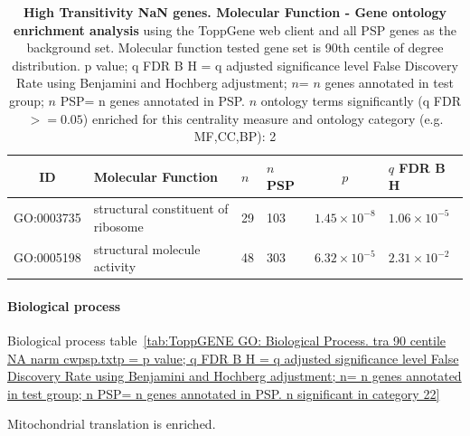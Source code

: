   \begin{table}[ht]
\centering
\begin{adjustbox}{width=\textwidth}
\setlength{\extrarowheight}{2pt}
\begin{tabular}{@{}clllcl@{}}
  \toprule
  ID &Molecular Function & $n$ & $n$ PSP & $p$ & $q$ FDR B H \\ 

  \midrule
GO:0003735 & structural constituent of ribosome & 29 & 103 & $1.45 \times 10^{-8}$ & $1.06 \times 10^{-5}$ \\ 
  GO:0005198 & structural molecule activity & 48 & 303 & $6.32 \times 10^{-5}$ & $2.31 \times 10^{-2}$ \\ 
   \hline
\end{tabular}
\end{adjustbox}
\caption[Gene ontology enrichment High Transitivity NaN genes. Molecular Function of genes above 90th centile of distribution]{\textbf{High Transitivity NaN genes. Molecular Function - Gene ontology enrichment analysis} using the ToppGene web client and all PSP genes as the background set.  Molecular function tested gene set is 90th centile of degree distribution.  p value; q FDR B H = q adjusted significance level False Discovery Rate using Benjamini and Hochberg adjustment; $n$= $n$ genes annotated in test group; $n$ PSP= n genes annotated in PSP. $n$ ontology terms significantly (q FDR$>=0.05$) enriched for this centrality measure and ontology category (e.g. MF,CC,BP): 2} 

\label{tab:ToppGENE GO: Molecular Function. tra 90 centile NA narm cwpsp.txtp = p value; q FDR B H = q adjusted significance level False Discovery Rate using Benjamini and Hochberg adjustment; n= n genes annotated in test group; n PSP= n genes annotated in PSP. n significant in category 2}
\end{table}
\paragraph{Biological process}
Biological process table~\ref{tab:ToppGENE GO: Biological Process. tra 90 centile NA narm cwpsp.txtp = p value; q FDR B H = q adjusted significance level False Discovery Rate using Benjamini and Hochberg adjustment; n= n genes annotated in test group; n PSP= n genes annotated in PSP. n significant in category 22}

Mitochondrial translation is enriched. 



